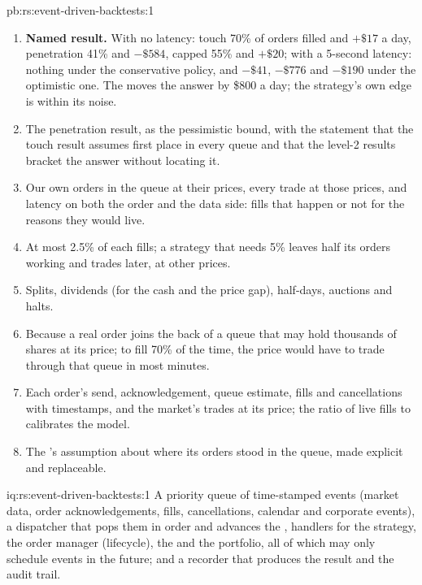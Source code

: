 \begin{solution}{pb:rs:event-driven-backtests:1}
\begin{enumerate}
\item \textbf{Named result.} With no latency: touch 70\% of orders filled and $+\$17$ a day, penetration 41\% and $-\$584$, capped 55\% and $+\$20$; with a
5-second latency: nothing under the conservative policy, and $-\$41$, $-\$776$ and $-\$190$ under the optimistic one. The  moves the answer by \$800
a day; the strategy's own edge is within its noise.
\item The penetration result, as the pessimistic bound, with the statement that the touch result assumes first place in every queue and that the level-2
results bracket the answer without locating it.
\item Our own orders in the queue at their prices, every trade at those prices, and latency on both the order and the data side: fills that happen or not
for the reasons they would live.
\item At most 2.5\% of each  fills; a strategy that needs 5\% leaves half its orders working and trades later, at other prices.
\item Splits, dividends (for the cash and the price gap), half-days, auctions and halts.
\item Because a real order joins the back of a queue that may hold thousands of shares at its price; to fill 70\% of the time, the price would have to trade
through that queue in most minutes.
\item Each order's send, acknowledgement, queue estimate, fills and cancellations with timestamps, and the market's trades at its price; the ratio of live
fills to  calibrates the model.
\item The 's assumption about where its orders stood in the queue, made explicit and replaceable.
\end{enumerate}
\end{solution}

\begin{solution}{iq:rs:event-driven-backtests:1}
A priority queue of time-stamped events (market data, order acknowledgements, fills, cancellations, calendar and corporate events), a dispatcher that pops
them in order and advances the , handlers for the strategy, the order manager (lifecycle), the  and the portfolio, all of which may
only schedule events in the future; and a recorder that produces the result and the audit trail.
\end{solution}

